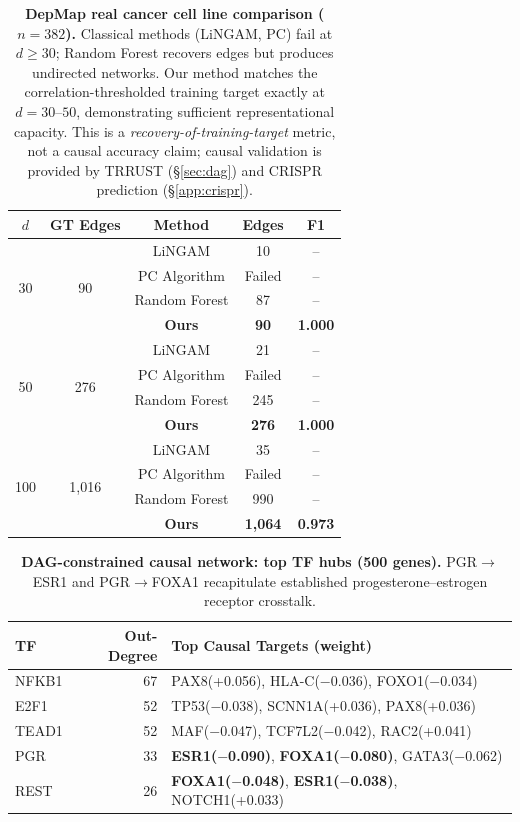 \documentclass{article}
\theoremstyle{definition}
\begin{document}
\begin{table}[t]
\centering
\caption{\textbf{DepMap real cancer cell line comparison ($n=382$).} Classical methods (LiNGAM, PC) fail at $d \ge 30$; Random Forest recovers edges but produces undirected networks. Our method matches the correlation-thresholded training target exactly at $d=30$--$50$, demonstrating sufficient representational capacity. This is a \emph{recovery-of-training-target} metric, not a causal accuracy claim; causal validation is provided by TRRUST (\S\ref{sec:dag}) and CRISPR prediction (\S\ref{app:crispr}).}
\label{tab:depmap}
\small
\begin{tabular}{ccccc}
\toprule
$d$ & GT Edges & Method & Edges & F1 \\
\midrule
\multirow{4}{2em}{30} & \multirow{4}{2em}{90} & LiNGAM & 10 & -- \\
& & PC Algorithm & Failed & -- \\
& & Random Forest & 87 & -- \\
& & \textbf{Ours} & \textbf{90} & \textbf{1.000} \\
\midrule
\multirow{4}{2em}{50} & \multirow{4}{2em}{276} & LiNGAM & 21 & -- \\
& & PC Algorithm & Failed & -- \\
& & Random Forest & 245 & -- \\
& & \textbf{Ours} & \textbf{276} & \textbf{1.000} \\
\midrule
\multirow{4}{2em}{100} & \multirow{4}{2em}{1,016} & LiNGAM & 35 & -- \\
& & PC Algorithm & Failed & -- \\
& & Random Forest & 990 & -- \\
& & \textbf{Ours} & \textbf{1,064} & \textbf{0.973} \\
\bottomrule
\end{tabular}
\end{table}

\begin{table}[H]
\centering
\caption{\textbf{DAG-constrained causal network: top TF hubs (500 genes).} PGR$\to$ESR1 and PGR$\to$FOXA1 recapitulate established progesterone--estrogen receptor crosstalk.}
\label{tab:dag_hubs}
\small
\begin{tabular}{lrl}
\toprule
TF & Out-Degree & Top Causal Targets (weight) \\
\midrule
NFKB1 & 67 & PAX8(+0.056), HLA-C($-$0.036), FOXO1($-$0.034) \\
E2F1 & 52 & TP53($-$0.038), SCNN1A(+0.036), PAX8(+0.036) \\
TEAD1 & 52 & MAF($-$0.047), TCF7L2($-$0.042), RAC2(+0.041) \\
PGR & 33 & \textbf{ESR1($-$0.090)}, \textbf{FOXA1($-$0.080)}, GATA3($-$0.062) \\
REST & 26 & \textbf{FOXA1($-$0.048)}, \textbf{ESR1($-$0.038)}, NOTCH1(+0.033) \\
\bottomrule
\end{tabular}
\end{table}
\end{document}
